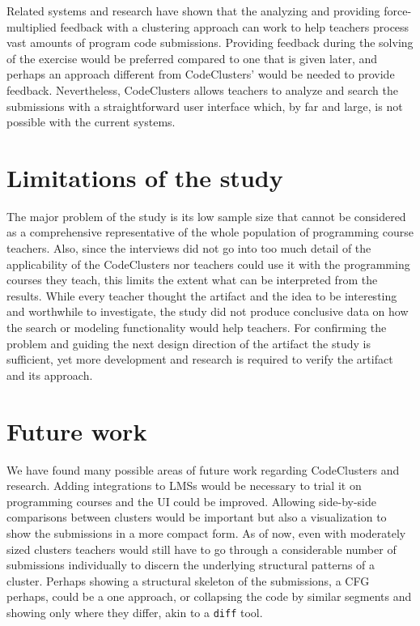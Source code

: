 Related systems and research have shown that the analyzing and providing force-multiplied feedback with a clustering approach can work to help teachers process vast amounts of program code submissions. Providing feedback during the solving of the exercise would be preferred compared to one that is given later, and perhaps an approach different from CodeClusters' would be needed to provide feedback. Nevertheless, CodeClusters allows teachers to analyze and search the submissions with a straightforward user interface which, by far and large, is not possible with the current systems.

\section{Limitations of the study}

The major problem of the study is its low sample size that cannot be considered as a comprehensive representative of the whole population of programming course teachers. Also, since the interviews did not go into too much detail of the applicability of the CodeClusters nor teachers could use it with the programming courses they teach, this limits the extent what can be interpreted from the results. While every teacher thought the artifact and the idea to be interesting and worthwhile to investigate, the study did not produce conclusive data on how the search or modeling functionality would help teachers. For confirming the problem and guiding the next design direction of the artifact the study is sufficient, yet more development and research is required to verify the artifact and its approach.

\section{Future work}

We have found many possible areas of future work regarding CodeClusters and research. Adding integrations to LMSs would be necessary to trial it on programming courses and the UI could be improved. Allowing side-by-side comparisons between clusters would be important but also a visualization to show the submissions in a more compact form. As of now, even with moderately sized clusters teachers would still have to go through a considerable number of submissions individually to discern the underlying structural patterns of a cluster. Perhaps showing a structural skeleton of the submissions, a CFG perhaps, could be a one approach, or collapsing the code by similar segments and showing only where they differ, akin to a \texttt{diff} tool.

